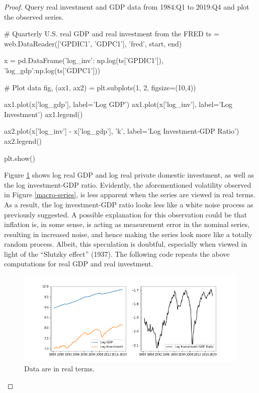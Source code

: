 \documentclass[oneside,reqno]{amsart}
\theoremstyle{definition}
\begin{document}
\begin{enumerate}[label=(\roman*)]
\begin{proof}
Query real investment and GDP data from 1984:Q1 to 2019:Q4 and plot the observed series.
\begin{python3code}
# Quarterly U.S. real GDP and real investment from the FRED
ts = web.DataReader(['GPDIC1', 'GDPC1'], 'fred', start, end)
    
x = pd.DataFrame({'log_inv': np.log(ts['GPDIC1']),
                  'log_gdp':np.log(ts['GDPC1'])})

# Plot data
fig, (ax1, ax2) = plt.subplots(1, 2, figsize=(10,4))

ax1.plot(x['log_gdp'], label='Log GDP')
ax1.plot(x['log_inv'], label='Log Investment')
ax1.legend()

ax2.plot(x['log_inv'] - x['log_gdp'], 'k', label='Log Investment-GDP Ratio')
ax2.legend()

plt.show()
\end{python3code}

Figure \ref{real-macro-series} shows log real GDP and log real private domestic investment, as well as the log investment-GDP ratio. Evidently, the aforementioned volatility observed in Figure \ref{macro-series}, is less apparent when the series are viewed in real terms. As a result, the log investment-GDP ratio looks less like a white noise process as previously suggested. A possible explanation for this observation could be that inflation is, in some sense, is acting as measurement error in the nominal series, resulting in increased noise, and hence making the series look more like a totally random process. Albeit, this speculation is doubtful, especially when viewed in light of the ``Slutzky  effect'' (1937). The following code repeats the above computations for real GDP and real investment. 

\begin{figure}
\includegraphics[width=\textwidth]{real-macro-series}
\caption{Data are in real terms.}
\label{real-macro-series}
\end{figure}


\end{proof}
\end{enumerate}
\end{document}
